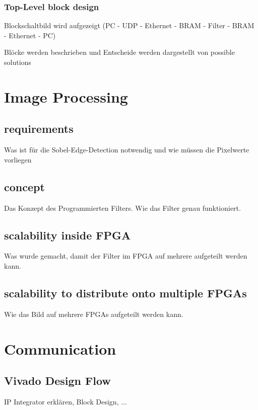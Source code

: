 \subsubsection{Top-Level block design}
Blockschaltbild wird aufgezeigt (PC - UDP - Ethernet - BRAM - Filter - BRAM - Ethernet - PC)

Blöcke werden beschrieben und Entscheide werden dargestellt von possible solutions

\section{Image Processing}
\subsection{requirements}
Was ist für die Sobel-Edge-Detection notwendig und wie müssen die Pixelwerte vorliegen

\subsection{concept}
Das Konzept des Programmierten Filters. Wie das Filter genau funktioniert. 

\subsection{scalability inside FPGA}
Was wurde gemacht, damit der Filter im FPGA auf mehrere aufgeteilt werden kann. 

\subsection{scalability to distribute onto multiple FPGAs}
Wie das Bild auf mehrere FPGAs aufgeteilt werden kann.

\section{Communication}
\subsection{Vivado Design Flow}
IP Integrator erklären, Block Design, ...

